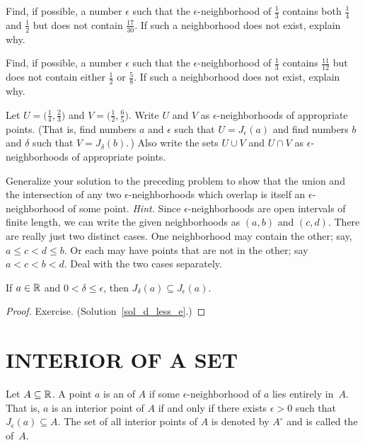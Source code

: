 \begin{prob} Find, if possible, a number $\epsilon$ such that the $\epsilon$-neigh\-bor\-hood
of $\frac13$ contains both $\frac14$ and $\frac12$ but does not contain $\frac{17}{30}$.
If such a neighborhood does not exist, explain why.
\end{prob}

\begin{prob} Find, if possible, a number $\epsilon$ such that the $\epsilon$-neigh\-bor\-hood
of $\frac13$ contains $\frac{11}{12}$ but does not contain either $\frac12$ or $\frac58$.  If
such a neighborhood does not exist, explain why.
\end{prob}

\begin{prob} Let $U = \bigl(\frac14, \frac23\bigr)$ and $V = \bigl(\frac12,\frac65\bigr)$.
Write $U$ and $V$ as $\epsilon$-neighborhoods of appropriate points. (That is, find
numbers $a$ and $\epsilon$ such that $U = J_\epsilon(a)$ and find numbers $b$ and
$\delta$ such that $V = J_\delta(b)$.\,)  Also write the sets $U \cup V$ and $U \cap V$
as $\epsilon$-neighborhoods of appropriate points.
\end{prob}

\begin{prob} Generalize your solution to the preceding problem to show that the union and the
intersection of any two $\epsilon$-neighborhoods which overlap is itself an
$\epsilon$-neighborhood of some point.  \emph{Hint.} Since $\epsilon$-neighborhoods are open
intervals of finite length, we can write the given neighborhoods as $(a,b)$ and $(c,d)$.
There are really just two distinct cases.  One neighborhood may contain the other; say, $a \le
c < d \le b$.  Or each may have points that are not in the other; say $a < c < b < d$.  Deal
with the two cases separately.
\end{prob}

\begin{prop}\label{d_less_e} If $a \in \mathbb{R}$ and $0 < \delta \le \epsilon$, then $J_\delta(a)
\subseteq J_\epsilon(a)$.
\end{prop}

\begin{proof} Exercise. (Solution~\ref{sol_d_less_e}.)
 \ns \end{proof}










\section{INTERIOR OF A SET}
\begin{defn} Let $A \subseteq \mathbb{R}$. A point $a$ is an
 of $A$ if some $\epsilon$-neighborhood of $a$ lies entirely in~$A$.  That
is, $a$ is an interior point of $A$ if and only if there exists $\epsilon > 0$ such that
$J_\epsilon(a) \subseteq A$. The set of all interior points of $A$ is denoted by $A^\circ$ and
is called the
 of~$A$.
\end{defn}

